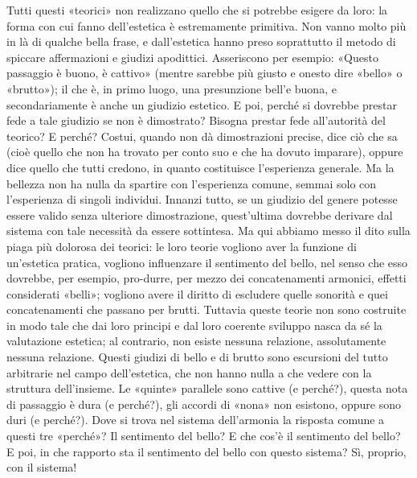 \documentclass{../../lib/gs}
\begin{document}
Tutti questi «teorici» non realizzano quello che si potrebbe esigere da loro: la forma con cui fanno dell'estetica è estremamente primitiva. Non vanno molto più in là di qualche bella frase, e dall'estetica hanno preso soprattutto il metodo di spiccare affermazioni e giudizi apodittici. Asseriscono per esempio: «Questo passaggio è buono, è cattivo» (mentre sarebbe più giusto e onesto dire «bello» o «brutto»); il che è, in primo luogo, una presunzione bell'e buona, e secondariamente è anche un giudizio estetico. E poi, perché si dovrebbe prestar fede a tale giudizio se non è dimostrato? Bisogna prestar fede all'autorità del teorico? E perché? Costui, quando non dà dimostrazioni precise, dice ciò che sa (cioè quello che non ha trovato per conto suo e che ha dovuto imparare), oppure dice quello che tutti credono, in quanto costituisce l'esperienza generale. Ma la bellezza non ha nulla da spartire con l'esperienza comune, semmai solo con l'esperienza di singoli individui. Innanzi tutto, se un giudizio del genere potesse essere valido senza ulteriore dimostrazione, quest'ultima dovrebbe derivare dal sistema con tale necessità da essere sottintesa. Ma qui abbiamo messo il dito sulla piaga più dolorosa dei teorici: le loro teorie vogliono aver la funzione di un'estetica pratica, vogliono influenzare il sentimento del bello, nel senso che esso dovrebbe, per esempio, pro-durre, per mezzo dei concatenamenti armonici, effetti considerati «belli»; vogliono avere il diritto di escludere quelle sonorità e quei concatenamenti che passano per brutti. Tuttavia queste teorie non sono costruite in modo tale che dai loro principi e dal loro coerente sviluppo nasca da sé la valutazione estetica; al contrario, non esiste nessuna relazione, assolutamente nessuna relazione. Questi giudizi di bello e di brutto sono escursioni del tutto arbitrarie nel campo dell'estetica, che non hanno nulla a che vedere con la struttura dell'insieme. Le «quinte» parallele sono cattive (e perché?), questa nota di passaggio è dura (e perché?), gli accordi di «nona» non esistono, oppure sono duri (e perché?). Dove si trova nel sistema dell'armonia la risposta comune a questi tre «perché»? Il sentimento del bello? E che cos'è il sentimento del bello? E poi, in che rapporto sta il sentimento del bello con questo sistema? Sì, proprio, con il sistema!
\end{document}
